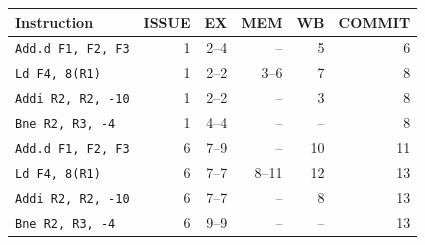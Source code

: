 \begin{tabular}{@{}lrrrrr@{}}\toprule
Instruction & ISSUE & EX & MEM & WB & COMMIT\\\midrule
\texttt{Add.d F1, F2, F3} & 1 & 2--4 & -- & 5 & 6 \\
\texttt{Ld F4, 8(R1)} & 1 & 2--2 & 3--6 & 7 & 8 \\
\texttt{Addi R2, R2, -10} & 1 & 2--2 & -- & 3 & 8 \\
\texttt{Bne R2, R3, -4} & 1 & 4--4 & -- & -- & 8 \\
\texttt{Add.d F1, F2, F3} & 6 & 7--9 & -- & 10 & 11 \\
\texttt{Ld F4, 8(R1)} & 6 & 7--7 & 8--11 & 12 & 13 \\
\texttt{Addi R2, R2, -10} & 6 & 7--7 & -- & 8 & 13 \\
\texttt{Bne R2, R3, -4} & 6 & 9--9 & -- & -- & 13 \\
\bottomrule\end{tabular}